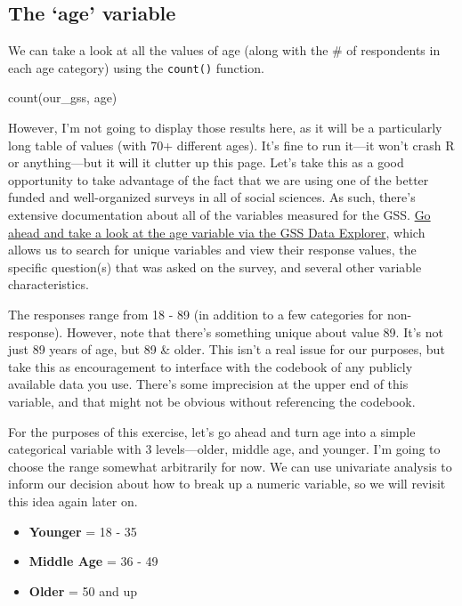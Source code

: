 \documentclass[
  letterpaper,
  DIV=11,
  numbers=noendperiod]{scrreprt}
\newenvironment{Shaded}{\begin{snugshade}}{\end{snugshade}}
\newcommand{\FunctionTok}[1]{\textcolor[rgb]{0.28,0.35,0.67}{#1}}
\newcommand{\NormalTok}[1]{\textcolor[rgb]{0.00,0.23,0.31}{#1}}
\providecommand{\tightlist}{%
  \setlength{\itemsep}{0pt}\setlength{\parskip}{0pt}}
\begin{document}
\subsection{The `age' variable}\label{the-age-variable}

We can take a look at all the values of age (along with the \# of
respondents in each age category) using the \texttt{count()} function.

\begin{Shaded}
\begin{Highlighting}[]
\FunctionTok{count}\NormalTok{(our\_gss, age)}
\end{Highlighting}
\end{Shaded}

However, I'm not going to display those results here, as it will be a
particularly long table of values (with 70+ different ages). It's fine
to run it---it won't crash R or anything---but it will it clutter up
this page. Let's take this as a good opportunity to take advantage of
the fact that we are using one of the better funded and well-organized
surveys in all of social sciences. As such, there's extensive
documentation about all of the variables measured for the GSS.
\href{https://gssdataexplorer.norc.org/variables/53/vshow}{Go ahead and
take a look at the age variable via the GSS Data Explorer}, which allows
us to search for unique variables and view their response values, the
specific question(s) that was asked on the survey, and several other
variable characteristics.

The responses range from 18 - 89 (in addition to a few categories for
non-response). However, note that there's something unique about value
89. It's not just 89 years of age, but 89 \& older. This isn't a real
issue for our purposes, but take this as encouragement to interface with
the codebook of any publicly available data you use. There's some
imprecision at the upper end of this variable, and that might not be
obvious without referencing the codebook.

For the purposes of this exercise, let's go ahead and turn age into a
simple categorical variable with 3 levels---older, middle age, and
younger. I'm going to choose the range somewhat arbitrarily for now. We
can use univariate analysis to inform our decision about how to break up
a numeric variable, so we will revisit this idea again later on.

\begin{itemize}
\tightlist
\item
  \textbf{Younger} = 18 - 35
\item
  \textbf{Middle Age} = 36 - 49
\item
  \textbf{Older} = 50 and up
\end{itemize}
\end{document}
